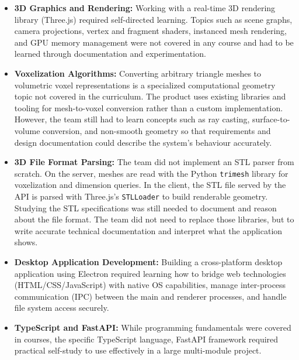 \documentclass[12pt, titlepage]{article}
\begin{document}
\begin{itemize}

  \item \textbf{3D Graphics and Rendering:} Working with a real-time 3D rendering library (Three.js) required self-directed learning. Topics such as scene graphs, camera projections, vertex and fragment shaders, instanced mesh rendering, and GPU memory management were not covered in any course and had to be learned through documentation and experimentation.

  \item \textbf{Voxelization Algorithms:} Converting arbitrary triangle meshes to volumetric voxel representations is a specialized computational geometry topic not covered in the curriculum. The product uses existing libraries and tooling for mesh-to-voxel conversion rather than a custom implementation. However, the team still had to learn concepts such as ray casting, surface-to-volume conversion, and non-smooth geometry so that requirements and design documentation could describe the system's behaviour accurately.

  \item \textbf{3D File Format Parsing:} The team did not implement an STL parser from scratch. On the server, meshes are read with the Python \texttt{trimesh} library for voxelization and dimension queries. In the client, the STL file served by the API is parsed with Three.js's \texttt{STLLoader} to build renderable geometry. Studying the STL specifications was still needed to document and reason about the file format. The team did not need to replace those libraries, but to write accurate technical documentation and interpret what the application shows.

  \item \textbf{Desktop Application Development:} Building a cross-platform desktop application using Electron required learning how to bridge web technologies (HTML/CSS/JavaScript) with native OS capabilities, manage inter-process communication (IPC) between the main and renderer processes, and handle file system access securely.

  \item \textbf{TypeScript and FastAPI:} While programming fundamentals were covered in courses, the specific TypeScript language, FastAPI framework required practical self-study to use effectively in a large multi-module project.

\end{itemize}
\end{document}
